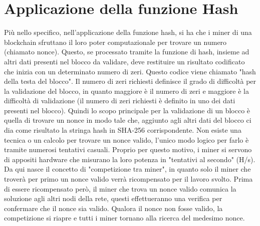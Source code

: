 \section{Applicazione della funzione Hash}
Più nello specifico, nell'applicazione della funzione hash, si ha che i miner di una blockchain sfruttano il loro poter computazionale per trovare un numero (chiamato nonce). Questo, se processato tramite la funzione di hash, insieme ad altri dati presenti nel blocco da validare, deve restituire un risultato codificato che inizia con un determinato numero di zeri. Questo codice viene chiamato "hash della testa del blocco". Il numero di zeri richiesti definisce il grado di difficoltà per la validazione del blocco, in quanto maggiore è il numero di zeri e maggiore è la difficoltà di validazione (il numero di zeri richiesti è definito in uno dei dati presenti nel blocco). Quindi lo scopo principale per la validazione di un blocco è quella di trovare un nonce in modo tale che, aggiunto agli altri dati del blocco ci dia come risultato la stringa hash in SHA-256 corrispondente. Non esiste una tecnica o un calcolo per trovare un nonce valido, l'unico modo logico per farlo è tramite numerosi tentativi casuali. Proprio per questo motivo, i miner si servono di appositi hardware che misurano la loro potenza in "tentativi al secondo" (H/s). Da qui nasce il concetto di "competizione tra miner", in quanto solo il miner che troverà per primo un nonce valido verrà ricompensato per il lavoro svolto. Prima di essere ricompensato però, il miner che trova un nonce valido comunica la soluzione agli altri nodi della rete, questi effettueranno una verifica per confermare che il nonce sia valido. Qualora il nonce non fosse valido, la competizione si riapre e tutti i miner tornano alla ricerca del medesimo nonce.
\newpage
